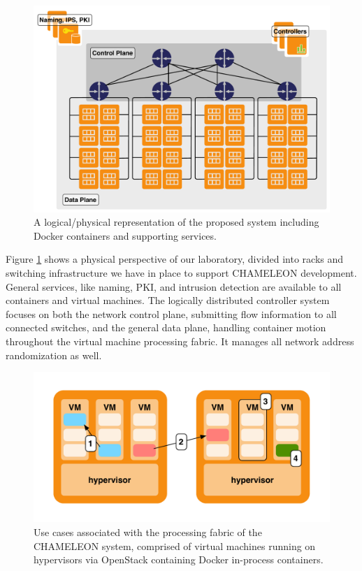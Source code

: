 \documentclass{sbir}
\begin{document}
\begin{figure}[!t]
\centering
\includegraphics[width=\textwidth]{images/physical.pdf}
\caption{A logical/physical representation of the proposed system including Docker containers and supporting services.}
\label{fig:physical}
\end{figure}

Figure \ref{fig:physical} shows a physical perspective of our laboratory, divided into racks and switching infrastructure we have in place to support CHAMELEON development.  General services, like naming, PKI, and intrusion detection are available to all containers and virtual machines. The logically distributed controller system focuses on both the network control plane, submitting flow information to all connected switches, and the general data plane, handling container motion throughout the virtual machine processing fabric. It manages all network address randomization as well.

\begin{figure}[!t]
\centering
\includegraphics[width=\textwidth]{images/fabric.pdf}
\caption{Use cases associated with the processing fabric of the CHAMELEON system, comprised of virtual machines running on hypervisors via OpenStack containing Docker in-process containers.}
\label{fig:fabric}
\end{figure}
\end{document}
